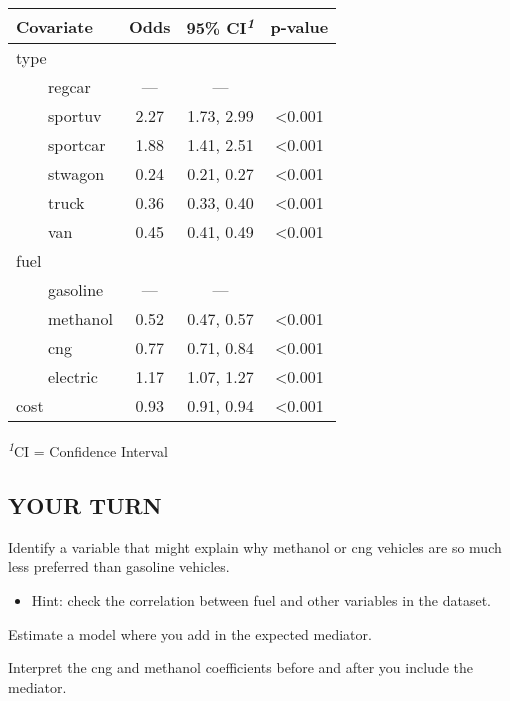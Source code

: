 \documentclass[
  11pt,
]{article}
\providecommand{\tightlist}{%
  \setlength{\itemsep}{0pt}\setlength{\parskip}{0pt}}
\begin{document}
\footnotesize

\setlength{\LTpost}{0mm}
\begin{longtable}{lccc}
\toprule
\textbf{Covariate} & \textbf{Odds} & \textbf{95\% CI}\textsuperscript{\textit{1}} & \textbf{p-value} \\ 
\midrule\addlinespace[2.5pt]
type &  &  &  \\ 
    regcar & — & — &  \\ 
    sportuv & 2.27 & 1.73, 2.99 & <0.001 \\ 
    sportcar & 1.88 & 1.41, 2.51 & <0.001 \\ 
    stwagon & 0.24 & 0.21, 0.27 & <0.001 \\ 
    truck & 0.36 & 0.33, 0.40 & <0.001 \\ 
    van & 0.45 & 0.41, 0.49 & <0.001 \\ 
fuel &  &  &  \\ 
    gasoline & — & — &  \\ 
    methanol & 0.52 & 0.47, 0.57 & <0.001 \\ 
    cng & 0.77 & 0.71, 0.84 & <0.001 \\ 
    electric & 1.17 & 1.07, 1.27 & <0.001 \\ 
cost & 0.93 & 0.91, 0.94 & <0.001 \\ 
\bottomrule
\end{longtable}
\begin{minipage}{\linewidth}
\textsuperscript{\textit{1}}CI = Confidence Interval\\
\end{minipage}

\normalsize

\hypertarget{your-turn}{%
\subsection{YOUR TURN}\label{your-turn}}

Identify a variable that might explain why methanol or cng vehicles are
so much less preferred than gasoline vehicles.

\begin{itemize}
\tightlist
\item
  Hint: check the correlation between fuel and other variables in the
  dataset.
\end{itemize}

Estimate a model where you add in the expected mediator.

Interpret the cng and methanol coefficients before and after you include
the mediator.
\end{document}
